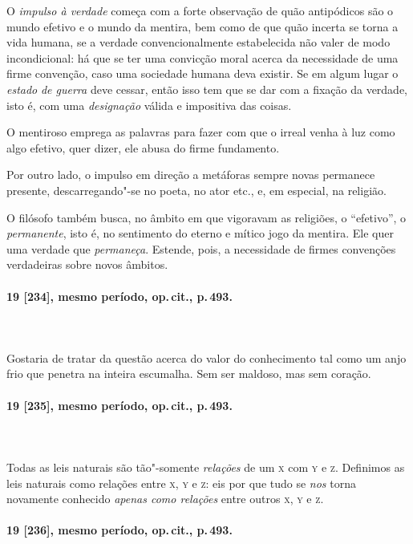 O \textit{impulso à verdade} começa com a forte observação de quão
antipódicos são o mundo efetivo e o mundo da mentira, bem como de que
quão incerta se torna a vida humana, se a verdade convencionalmente
estabelecida não valer de modo incondicional: há que se ter uma
convicção moral acerca da necessidade de uma firme convenção, caso uma
sociedade humana deva existir. Se em algum lugar o \textit{estado}
\textit{de guerra} deve cessar, então isso tem que se dar com a fixação
da verdade, isto é, com uma \textit{designação} válida e impositiva das
coisas.

O mentiroso emprega as palavras para fazer com que o irreal venha à luz
como algo efetivo, quer dizer, ele abusa do firme fundamento.

Por outro lado, o impulso em direção a metáforas sempre novas permanece
presente, descarregando"-se no poeta, no ator etc., e, em especial, na
religião. 

O filósofo também busca, no âmbito em que vigoravam as religiões, o
“efetivo”, o \textit{permanente}, isto é, no sentimento do eterno e
mítico jogo da mentira. Ele quer uma verdade que \textit{permaneça}.
Estende, pois, a necessidade de firmes convenções verdadeiras sobre
novos âmbitos.

\pagebreak
\paragraph*{19 [234], mesmo período, op.\,cit., p.\,493.}
\ \\
\ \\

Gostaria de tratar da questão acerca do valor do conhecimento tal como
um anjo frio que penetra na inteira escumalha. Sem ser maldoso, mas sem
coração. 
\pagebreak
\paragraph*{19 [235], mesmo período, op.\,cit., p.\,493.}
\ \\
\ \\

Todas as leis naturais são tão"-somente \textit{relações} de um \textsc{x} com \textsc{y}
e \textsc{z}. Definimos as leis naturais como relações entre \textsc{x}, 
\textsc{y} e \textsc{z}: eis por
que tudo se \textit{nos} torna novamente conhecido \textit{apenas como
relações} entre outros \textsc{x}, \textsc{y} e \textsc{z}.

\pagebreak
\paragraph*{19 [236], mesmo período, op.\,cit., p.\,493.}
\ \\
\ \\

